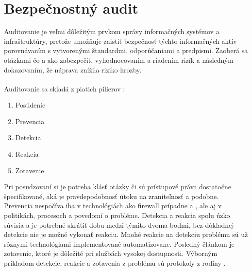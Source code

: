 \chapter{Bezpečnostný audit}
\label{bezpecnostny-audit}

Auditovanie je veľmi dôležitým prvkom správy informačných systémov a infraštruktúry, pretože umožňuje zaistiť bezpečnosť týchto informačných aktív porovnávaním s vytvorenými štandardmi, odporúčaniami a predpismi. Zaoberá sa otázkami čo a ako zabezpečiť, vyhodnocovaním a riadením rizík a následným dokazovaním, že náprava znížila riziko hrozby.
\\\\
\noindent
Auditovanie sa skladá z piatich pilierov \cite{Jackson2010}:

\begin{enumerate}
	\item Posúdenie
	\item Prevencia
	\item Detekcia
	\item Reakcia
	\item Zotavenie
\end{enumerate}

\vspace{1em}
\noindent
Pri posudzovaní si je potreba klásť otázky či sú prístupové práva dostatočne špecifikované, aká je pravdepodobnosť útoku na zraniteľnosť a podobne. Prevencia nespočíva iba v technológiách ako firewall prípadne  a , ale aj v politikách, procesoch a povedomí o probléme. Detekcia a reakcia spolu úzko súvisia a je potrebné skrátiť dobu medzi týmito dvoma bodmi, bez dôkladnej detekcie nie je možné vykonať reakciu.	Mnohé reakcie na detekciu problému sú už rôznymi technológiami implementované automatizovane. Posledný článkom je zotavenie, ktoré je dôležité pri službách vysokej dostupnosti. Výborným príkladom detekcie, reakcie a zotavenia z problému sú protokoly z rodiny .

